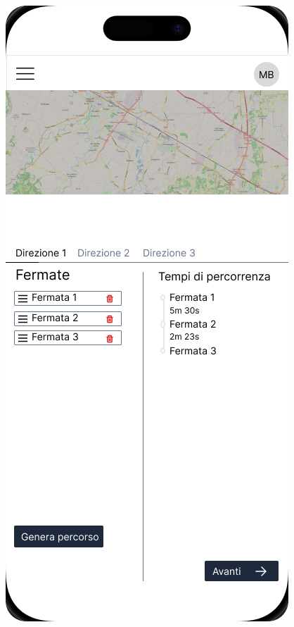 \begin{figure}[H]
  \centering
  \begin{minipage}[b]{0.25\textwidth}
    \centering
    \includegraphics[width=\textwidth]{images/mockup/Creazione linea Step 2.png}

\end{minipage}
\end{figure}
